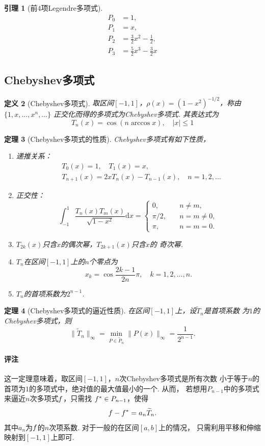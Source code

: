 \documentclass[12pt, a4paper]{article}
\theoremstyle{margin}
\newtheorem{thm}{定理}
\newtheorem{lemma}[thm]{引理}
\newtheorem{defi}[thm]{定义}
\newcommand{\f}{\mathnormal{f}}
\newcommand{\rd}{\mathrm{d}}
\newcommand{\remark}{\paragraph{评注}}
\begin{document}
  \begin{lemma}[前$4$项Legendre多项式]
    \[\begin{split}
      P_0 &= 1,\\
      P_1 &= x,\\
      P_2 &= \frac{3}{2}x^2 - \frac{1}{2},\\
      P_3 &= \frac{5}{2}x^3 - \frac{3}{2}x
    \end{split}\]
  \end{lemma}

\newpage
\subsection{Chebyshev多项式}
  \begin{defi}[Chebyshev多项式]
    取区间$[-1, 1]$，$\rho(x)=(1-x^2)^{-1/2}$，称由$\{1,x,\dots,x^n,\dots\}$
    正交化而得的多项式为Chebyshev多项式. 其表达式为
    \[
      T_n(x) = \cos(n\arccos x),\quad|x|\le 1
    \]
  \end{defi}

  \begin{thm}[Chebyshev多项式的性质]
    Chebyshev多项式有如下性质，
    \begin{enumerate}
      \item 递推关系：
      \[\begin{split}
        &T_0(x) = 1, \quad T_1(x) = x,\\
        &T_{n+1}(x) = 2xT_n(x) - T_{n-1}(x),\quad n =1,2,\dots
      \end{split}\]
      \item 正交性：
      \[
        \int_{-1}^1\frac{T_n(x)T_m(x)}{\sqrt{1-x^2}} \rd x =
        \begin{cases}
          0, &\quad n\ne m,\\
          \pi/2, &\quad n = m \ne 0,\\
          \pi,&\quad n = m = 0.
        \end{cases}
      \]
      \item $T_{2k}(x)$只含$x$的偶次幂，$T_{2k+1}(x)$只含$x$的
      奇次幂.
      \item $T_n$在区间$[-1, 1]$上的$n$个零点为
      \[
        x_k = \cos\frac{2k-1}{2n}\pi,\quad k = 1,2,\dots,n.
      \]
      \item $T_n$的首项系数为$2^{n-1}$.
    \end{enumerate}
  \end{thm}

  \begin{thm}[Chebyshev多项式的逼近性质]
    \label{thm: Chebyshev多项式的逼近性质}
    在区间$[-1,1]$上，设$\widetilde{T}_n$是首项系数
    为$1$的Chebyshev多项式，则
    \[
      \|\widetilde{T}_n\|_\infty = \min_{P\in\widetilde{P}_n}
      \|P(x)\|_\infty = \frac{1}{2^{n-1}}.
    \]
  \end{thm}
  \remark
    这一定理意味着，取区间$[-1, 1]$，$n$次Chebyshev多项式是所有次数
    小于等于$n$的首项为$1$的多项式中，绝对值的最大值最小的一个. 从而，
    若想用$P_{n-1}$中的多项式来逼近$n$次多项式$\f$，只需找
    $\f^*\in P_{n-1}$，使得
    \[
      \f - \f^* = a_n \widetilde{T}_n.
    \]
    其中$a_n$为$\f$的$n$次项系数. 对于一般的在区间$[a, b]$上的情况，
    只需利用平移和伸缩映射到$[-1, 1]$上即可.
\end{document}
